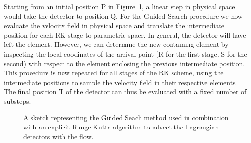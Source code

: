 Starting from an initial position P in Figure~\ref{fig:guided_search_menthod}, a linear step in physical space would take the detector to position Q. 
For the Guided Search procedure we now evaluate the velocity field in physical space and translate the intermediate position for each RK stage to parametric space.
In general, the detector will have left the element. However, we can determine the new containing element by inspecting the local coodinates of the arrival point 
(R for the first stage, S for the second) with respect to the element enclosing the previous intermediate position. 
This procedure is now repeated for all stages of the RK scheme, using the intermediate positions to sample the velocity field in their respective elements.
The final position T of the detector can thus be evaluated with a fixed number of substeps. 

\begin{figure}[ht]
  \centering
  \caption{A sketch representing the Guided Seach method used in combination with an explicit Runge-Kutta algorithm to advect the Lagrangian detectors with the flow.}
  \label{fig:guided_search_menthod}
\end{figure}


